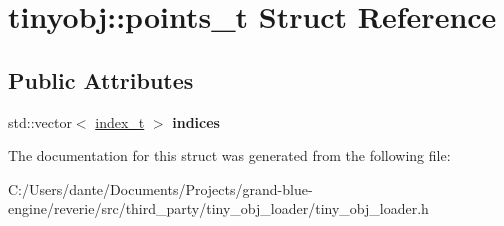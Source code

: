 \hypertarget{structtinyobj_1_1points__t}{}\section{tinyobj\+::points\+\_\+t Struct Reference}
\label{structtinyobj_1_1points__t}
\subsection*{Public Attributes}
\begin{DoxyCompactItemize}
\item 
\mbox{\label{structtinyobj_1_1points__t_aff29129fc00b8464233e1adbe8714add}} 
std\+::vector$<$ \mbox{\hyperlink{structtinyobj_1_1index__t}{index\+\_\+t}} $>$ {\bfseries indices}
\end{DoxyCompactItemize}


The documentation for this struct was generated from the following file\+:\begin{DoxyCompactItemize}
\item 
C\+:/\+Users/dante/\+Documents/\+Projects/grand-\/blue-\/engine/reverie/src/third\+\_\+party/tiny\+\_\+obj\+\_\+loader/tiny\+\_\+obj\+\_\+loader.\+h\end{DoxyCompactItemize}
